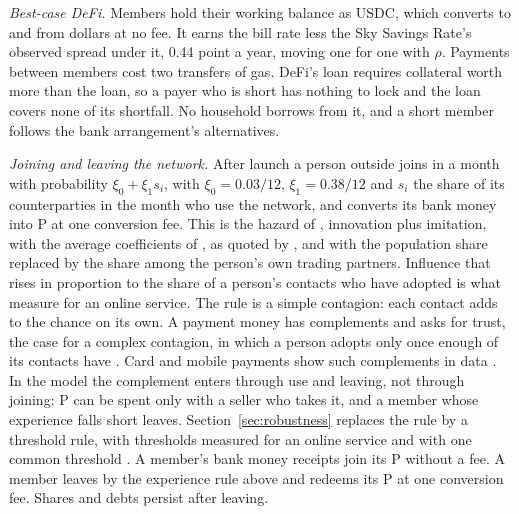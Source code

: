 \emph{Best-case DeFi.} Members hold their working balance as USDC, which converts to and from dollars at no fee. It
earns the bill rate less the Sky Savings Rate's observed spread under it, 0.44 point a year, moving one for one with
$\rho$. Payments between members cost two transfers of gas. DeFi's loan requires collateral worth more than the
loan, so a payer who is short has nothing to lock and the loan covers none of its shortfall. No household borrows
from it, and a short member follows the bank arrangement's alternatives.

\emph{Joining and leaving the network.} After launch a person outside joins in a month with probability
$\xi_{0} + \xi_{1} s_{i}$, with $\xi_{0} = 0.03/12$, $\xi_{1} = 0.38/12$ and $s_{i}$ the share of its counterparties
in the month who use the network, and converts its bank money into P at one conversion fee. This is the hazard of
\cite{bass}, innovation plus imitation, with the average coefficients of \cite{sultan}, as quoted by
\cite{vandenbulte}, and with the population
share replaced by the share among the person's own trading partners. Influence that rises in proportion to the
share of a person's contacts who have adopted is what \cite{karsaicontagion} measure for an online service. The
rule is a simple contagion: each contact adds to the chance on its own. A payment money has complements and asks
for trust, the case for a complex contagion, in which a person adopts only once enough of its contacts have
\cite{centolamacy}. Card and mobile payments show such complements in data \cite{higgins,crouzet}. In the
model the complement enters through use and leaving, not through joining: P can be spent only with a seller
who takes it, and a member whose experience falls short leaves. Section~\ref{sec:robustness} replaces the rule by a
threshold rule, with thresholds measured for an online service \cite{karsaicascades} and with one common
threshold \cite{watts}. A member's bank money
receipts join its P without a fee. A member leaves by the experience rule above and redeems its P at one conversion
fee. Shares and debts persist after leaving.

